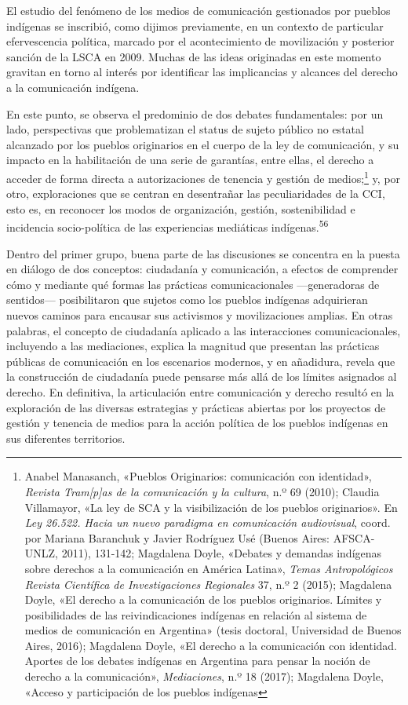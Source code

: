 \documentclass{tufte-handout}
\begin{document}
El estudio del fenómeno de los medios de comunicación gestionados por
pueblos indígenas se inscribió, como dijimos previamente, en un contexto
de particular efervescencia política, marcado por el acontecimiento de
movilización y posterior sanción de la LSCA en 2009. Muchas de las ideas
originadas en este momento gravitan en torno al interés por identificar
las implicancias y alcances del derecho a la comunicación indígena.

En este punto, se observa el predominio de dos debates fundamentales:
por un lado, perspectivas que problematizan el status de sujeto público
no estatal alcanzado por los pueblos originarios en el cuerpo de la ley
de comunicación, y su impacto en la habilitación de una serie de
garantías, entre ellas, el derecho a acceder de forma directa a
autorizaciones de tenencia y gestión de medios;\footnote{Anabel
  Manasanch, «Pueblos Originarios: comunicación con identidad»,
  \emph{Revista Tram{[}p{]}as de la comunicación y la cultura}, n.º 69
  (2010); Claudia Villamayor, «La ley de SCA y la visibilización de los
  pueblos originarios». En \emph{Ley 26.522. Hacia un nuevo paradigma en
  comunicación audiovisual}, coord. por Mariana Baranchuk y Javier
  Rodríguez Usé (Buenos Aires: AFSCA-UNLZ, 2011), 131-142; Magdalena
  Doyle, «Debates y demandas indígenas sobre derechos a la comunicación
  en América Latina», \emph{Temas Antropológicos Revista Científica de
  Investigaciones Regionales} 37, n.º 2 (2015); Magdalena Doyle, «El
  derecho a la comunicación de los pueblos originarios. Límites y
  posibilidades de las reivindicaciones indígenas en relación al sistema
  de medios de comunicación en Argentina» (tesis doctoral, Universidad
  de Buenos Aires, 2016); Magdalena Doyle, «El derecho a la comunicación
  con identidad. Aportes de los debates indígenas en Argentina para
  pensar la noción de derecho a la comunicación», \emph{Mediaciones},
  n.º 18 (2017); Magdalena Doyle, «Acceso y participación de los pueblos
  indígenas} y, por otro,
exploraciones que se centran en desentrañar las peculiaridades de la
CCI, esto es, en reconocer los modos de organización, gestión,
sostenibilidad e incidencia socio-política de las experiencias
mediáticas indígenas.\textsuperscript{56}

Dentro del primer grupo, buena parte de las discusiones se concentra en
la puesta en diálogo de dos conceptos: ciudadanía y comunicación, a
efectos de comprender cómo y mediante qué formas las prácticas
comunicacionales ---generadoras de sentidos--- posibilitaron que sujetos
como los pueblos indígenas adquirieran nuevos caminos para encausar sus
activismos y movilizaciones amplias. En otras palabras, el concepto de
ciudadanía aplicado a las interacciones comunicacionales, incluyendo a
las mediaciones, explica la magnitud que presentan las prácticas
públicas de comunicación en los escenarios modernos, y en añadidura,
revela que la construcción de ciudadanía puede pensarse más allá de los
límites asignados al derecho. En definitiva, la articulación entre
comunicación y derecho resultó en la exploración de las diversas
estrategias y prácticas abiertas por los proyectos de gestión y tenencia
de medios para la acción política de los pueblos indígenas en sus
diferentes territorios.
\end{document}
